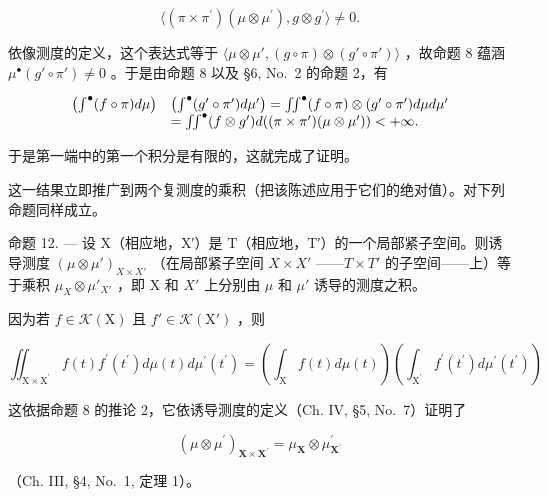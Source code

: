 \[
\langle (\pi \times \pi^ {\prime}) (\mu \otimes \mu^ {\prime}), g \otimes g ^ {\prime} \rangle \neq 0.
\]

依像测度的定义，这个表达式等于 \(\langle\mu\otimes\mu',(g\circ\pi)\otimes(g'\circ\pi')\rangle\) ，故命题 8 蕴涵 \(\mu^{\bullet}(g'\circ\pi')\neq0\) 。于是由命题 8 以及 §6, No.~2 的命题 2，有

\[
\begin{array}{r l} \left(\int^ {\bullet} (f \circ \pi) d \mu\right) & \left(\int^ {\bullet} (g ^ {\prime} \circ \pi^ {\prime}) d \mu^ {\prime}\right) = \iint^ {\bullet} (f \circ \pi) \otimes (g ^ {\prime} \circ \pi^ {\prime}) d \mu d \mu^ {\prime} \\ & = \iint^ {\bullet} (f \otimes g ^ {\prime}) d ((\pi \times \pi^ {\prime}) (\mu \otimes \mu^ {\prime})) <   + \infty . \end{array}
\]

于是第一端中的第一个积分是有限的，这就完成了证明。

这一结果立即推广到两个复测度的乘积（把该陈述应用于它们的绝对值）。对下列命题同样成立。

命题 12. --- 设 X（相应地，X′）是 T（相应地，T′）的一个局部紧子空间。则诱导测度 \((\mu \otimes \mu')_{X \times X'}\) （在局部紧子空间 \(X \times X'\) ——\(T \times T'\) 的子空间——上）等于乘积 \(\mu_{X} \otimes \mu'_{X'}\) ，即 X 和 \(X'\) 上分别由 \(\mu\) 和 \(\mu'\) 诱导的测度之积。

因为若 \(f \in \mathcal{K}(\mathrm{X})\) 且 \(f' \in \mathcal{K}(\mathrm{X}')\) ，则

\[
\iint_ {\mathrm{X} \times \mathrm{X} ^ {\prime}} f (t) f ^ {\prime} (t ^ {\prime}) d \mu (t) d \mu^ {\prime} (t ^ {\prime}) = \left(\int_ {\mathrm{X}} f (t) d \mu (t)\right) \left(\int_ {\mathrm{X} ^ {\prime}} f ^ {\prime} (t ^ {\prime}) d \mu^ {\prime} (t ^ {\prime})\right)
\]

这依据命题 8 的推论 2，它依诱导测度的定义（Ch. IV, §5, No.~7）证明了

\[
(\mu \otimes \mu^ {\prime}) _ {\mathbf {X} \times \mathbf {X} ^ {\prime}} = \mu_ {\mathbf {X}} \otimes \mu_ {\mathbf {X} ^ {\prime}} ^ {\prime}
\]

（Ch. III, §4, No.~1, 定理 1）。

